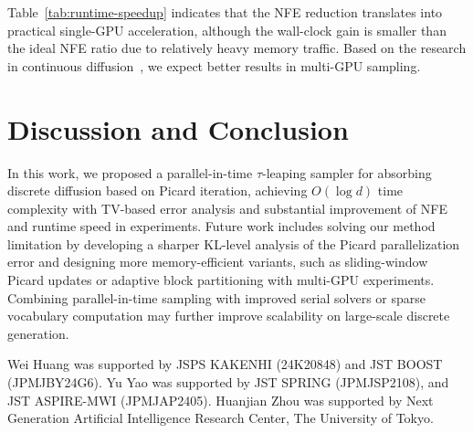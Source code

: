 \documentclass{article}
\begin{document}
Table~\ref{tab:runtime-speedup} indicates that the NFE reduction translates into practical single-GPU acceleration, although the wall-clock gain is smaller than the ideal NFE ratio due to relatively heavy memory traffic. Based on the research in continuous diffusion~\citep{shih2023parallel}, we expect better results in multi-GPU sampling.



\section{Discussion and Conclusion}



In this work, we proposed a parallel-in-time $\tau$-leaping sampler for absorbing discrete diffusion based on Picard iteration, achieving \(O(\log d)\) time complexity with TV-based error analysis and substantial improvement of NFE and runtime speed in experiments. Future work includes solving our method limitation by developing a sharper KL-level analysis of the Picard parallelization error and designing more memory-efficient variants, such as sliding-window Picard updates or adaptive block partitioning with multi-GPU experiments. 
Combining parallel-in-time sampling with improved serial solvers or sparse vocabulary computation may further improve scalability on large-scale discrete generation.

\begin{ack}
    Wei Huang was supported by JSPS KAKENHI (24K20848) and JST BOOST (JPMJBY24G6). Yu Yao was supported by JST SPRING (JPMJSP2108), and JST ASPIRE-MWI (JPMJAP2405). Huanjian Zhou was supported by Next Generation Artificial Intelligence Research Center, The University of Tokyo.
\end{ack}


\newpage




\newpage
\appendix


\end{document}
